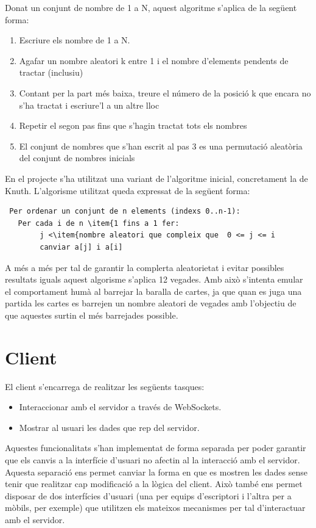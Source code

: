 Donat un conjunt de nombre de 1 a N, aquest algoritme s'aplica de la següent forma: 
\begin{enumerate}
\item{Escriure els nombre de 1 a N.}
\item{Agafar un nombre aleatori k entre 1 i el nombre d'elements pendents de tractar (inclusiu)}
\item{Contant per la part més baixa, treure el número de la posició k que encara no s'ha tractat i escriure'l a un altre lloc}
\item{Repetir el segon pas fins que s'hagin tractat tots els nombres}
\item{El conjunt de nombres que s'han escrit al pas 3 es una permutació aleatòria del conjunt de nombres inicials}
\end{enumerate}

En el projecte s'ha utilitzat una variant de l'algoritme inicial, concretament la de Knuth. L'algorisme utilitzat queda expressat de la següent forma: 

\begin{lstlisting}
 Per ordenar un conjunt de n elements (indexs 0..n-1):
   Per cada i de n \item{1 fins a 1 fer:
        j <\item{nombre aleatori que compleix que  0 <= j <= i
        canviar a[j] i a[i]
\end{lstlisting}

A més a més per tal de garantir la complerta aleatorietat i evitar possibles resultats iguals aquest algorisme s'aplica 12 vegades. Amb això s'intenta emular el comportament humà al barrejar la baralla de cartes, ja que quan es juga una partida les cartes es barrejen un nombre aleatori de vegades amb l'objectiu de que aquestes surtin el més barrejades possible. 

\section{Client}

El client s'encarrega de realitzar les següents tasques: 

\begin{itemize}
\item{Interaccionar amb el servidor a través de WebSockets.}
\item{Mostrar al usuari les dades que rep del servidor.}
\end{itemize}

Aquestes funcionalitats s'han implementat de forma separada per poder garantir que els canvis a la interfície d'usuari no afectin al la interacció amb el servidor. Aquesta separació ens permet canviar la forma en que es mostren les dades sense tenir que realitzar cap modificació a la lògica del client. Això també ens permet disposar de dos interfícies d'usuari (una per equips d'escriptori i l'altra per a mòbils, per exemple) que utilitzen els mateixos mecanismes per tal d'interactuar amb el servidor. 

